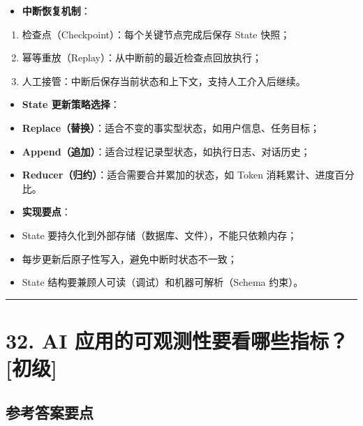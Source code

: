 \documentclass[9pt,a4paper,twocolumn]{ctexart}
\newcommand{\lvchu}{\usebox{\badgechubox}}
\def\lvchu{[初级]}%
\begin{document}
\begin{itemize}[itemsep=1pt, topsep=2pt]
  \item \textbf{中断恢复机制}：
\end{itemize}
\begin{enumerate}[itemsep=1pt, topsep=2pt]
  \item 检查点（Checkpoint）：每个关键节点完成后保存 State 快照；
  \item 幂等重放（Replay）：从中断前的最近检查点回放执行；
  \item 人工接管：中断后保存当前状态和上下文，支持人工介入后继续。
\end{enumerate}
\begin{itemize}[itemsep=1pt, topsep=2pt]
  \item \textbf{State 更新策略选择}：
  \item \textbf{Replace（替换）}：适合不变的事实型状态，如用户信息、任务目标；
  \item \textbf{Append（追加）}：适合过程记录型状态，如执行日志、对话历史；
  \item \textbf{Reducer（归约）}：适合需要合并累加的状态，如 Token 消耗累计、进度百分比。
  \item \textbf{实现要点}：
  \item State 要持久化到外部存储（数据库、文件），不能只依赖内存；
  \item 每步更新后原子性写入，避免中断时状态不一致；
  \item State 结构要兼顾人可读（调试）和机器可解析（Schema 约束）。
\end{itemize}


\vspace{2pt}
\noindent\rule{\columnwidth}{0.3pt}\vspace{2pt}



\section*{32. AI 应用的可观测性要看哪些指标？ \lvchu{}}


\subsection*{参考答案要点}
\end{document}
